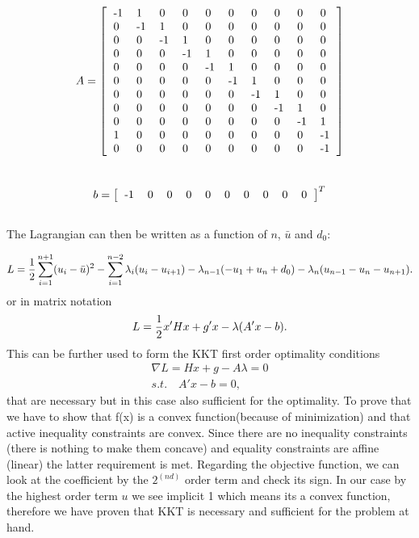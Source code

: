 \[A=\begin{bmatrix}
	\begin{tabular}{llllllllll}
-1 & 1  & 0  & 0  & 0  & 0  & 0  & 0  & 0  & 0  \\
0  & -1 & 1  & 0  & 0  & 0  & 0  & 0  & 0  & 0  \\
0  & 0  & -1 & 1  & 0  & 0  & 0  & 0  & 0  & 0  \\
0  & 0  & 0  & -1 & 1  & 0  & 0  & 0  & 0  & 0  \\
0  & 0  & 0  & 0  & -1 & 1  & 0  & 0  & 0  & 0  \\
0  & 0  & 0  & 0  & 0  & -1 & 1  & 0  & 0  & 0  \\
0  & 0  & 0  & 0  & 0  & 0  & -1 & 1  & 0  & 0  \\
0  & 0  & 0  & 0  & 0  & 0  & 0  & -1 & 1  & 0  \\
0  & 0  & 0  & 0  & 0  & 0  & 0  & 0  & -1 & 1  \\
1  & 0  & 0  & 0  & 0  & 0  & 0  & 0  & 0  & -1 \\
0  & 0  & 0  & 0  & 0  & 0  & 0  & 0  & 0  & -1
\end{tabular}
\end{bmatrix}\]\\

\[b= \begin{bmatrix}
	\begin{tabular}{llllllllll}
-1 & 0 & 0 & 0 & 0 & 0 & 0 & 0 & 0 & 0 
\end{tabular}
\end{bmatrix}^T\]\\
The Lagrangian can then be written as a function of $n$, $\bar{u}$ and $d_0$:

\begin{equation}
L = \frac{1}{2} \sum_{i=1}^{n+1} (u_i - \bar{u})^2\\ - \sum_{i=1}^{n-2} \lambda_i(u_i-u_{i+1}) - \lambda_{n-1}(-u_1+u_n+d_0) - \lambda_{n}(u_{n-1}-u_n-u_{n+1}).
\end{equation}
or in matrix notation
\begin{equation}
L = \frac{1}{2} x'Hx + g'x - \lambda(A'x - b).\\
\end{equation}
This can be further used to form the KKT first order optimality conditions
\begin{equation}
\begin{split}
\nabla L = Hx + g - A\lambda = 0\\
s.t. \quad A'x - b = 0,
\end{split}
\end{equation}
that are necessary but in this case also sufficient for the optimality. To prove that we have to show that f(x) is a convex  function(because of minimization) and that active inequality constraints are convex. Since there are no inequality constraints (there is nothing to make them concave) and equality constraints are affine (linear) the latter requirement is met. Regarding the objective function, we can look at the coefficient by the $2^(nd)$ order term and check its sign. In our case by the highest order term $u$ we see implicit 1 which means its a convex function, therefore we have proven that KKT is necessary and sufficient for the problem at hand.

